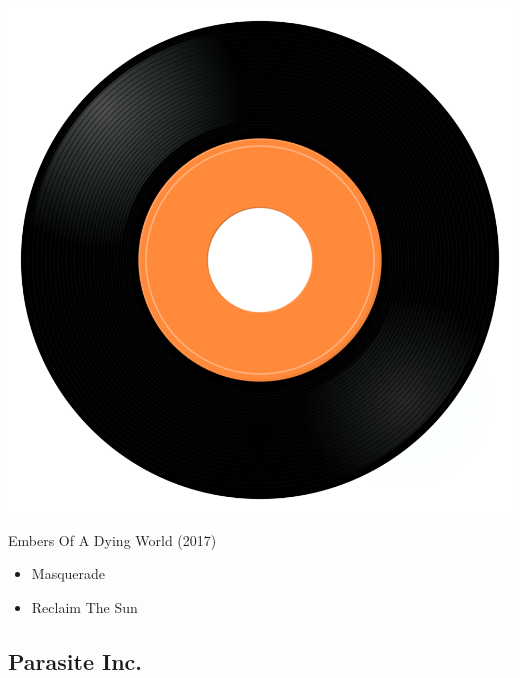 \begin{minipage}[t]{0.25\textwidth}\vspace{0pt}
\captionsetup{type=figure}
\includegraphics[width=\textwidth]{Images/cover.png}
\caption*{Embers Of A Dying World (2017)}
\end{minipage}
\begin{minipage}[t]{0.25\textwidth}\vspace{0pt}
\begin{itemize}[nosep,leftmargin=1em,labelwidth=*,align=left]
	\setlength{\itemsep}{0pt}
	\item Masquerade
	\item Reclaim The Sun
\end{itemize}
\end{minipage}

\subsection{Parasite Inc.}

